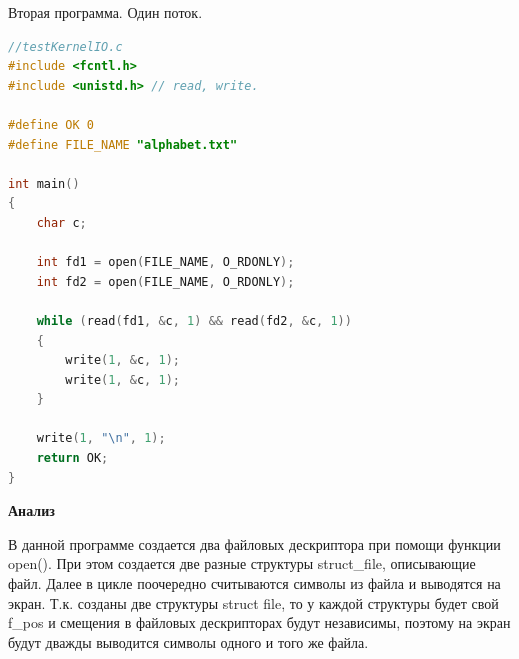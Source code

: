 \documentclass[a4paper,oneside,12pt]{extreport}
\begin{document}
\begin{task}
    Вторая программа. Один поток.
    \begin{lstlisting}[language=C]
        //testKernelIO.c
#include <fcntl.h>
#include <unistd.h> // read, write.

#define OK 0
#define FILE_NAME "alphabet.txt"

int main()
{
	char c;

	int fd1 = open(FILE_NAME, O_RDONLY);
	int fd2 = open(FILE_NAME, O_RDONLY);

	while (read(fd1, &c, 1) && read(fd2, &c, 1))
	{
		write(1, &c, 1);
		write(1, &c, 1);
	}

	write(1, "\n", 1);
	return OK;
}
    \end{lstlisting}

    
    
    \begin{figure}[ht!]
    \end{figure}
    
    \newpage
    \begin{center}
        \textbf{Анализ}        
    \end{center}

    В данной программе создается два файловых дескриптора при помощи функции open(). 
    При этом создается две разные структуры struct\_file, описывающие файл.
    Далее в цикле поочередно считываются символы из файла и выводятся на экран.
    Т.к. созданы две структуры struct file, то у каждой структуры будет
    свой f\_pos и смещения в файловых дескрипторах будут независимы,
    поэтому на экран будут дважды выводится символы одного и того же файла.

    \begin{figure}[ht!]
    \end{figure}


\end{task}
\end{document}
